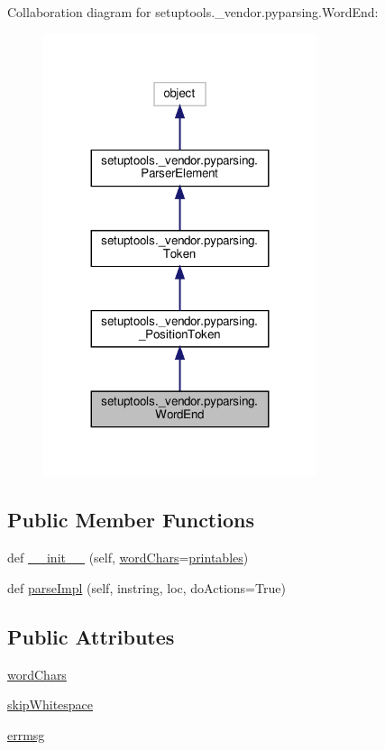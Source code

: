 Collaboration diagram for setuptools.\+\_\+vendor.\+pyparsing.\+Word\+End\+:
\nopagebreak
\begin{figure}[H]
\begin{center}
\leavevmode
\includegraphics[width=227pt]{classsetuptools_1_1__vendor_1_1pyparsing_1_1WordEnd__coll__graph}
\end{center}
\end{figure}
\subsection*{Public Member Functions}
\begin{DoxyCompactItemize}
\item 
def \hyperlink{classsetuptools_1_1__vendor_1_1pyparsing_1_1WordEnd_a16cf414fea8691c74fd805e487967613}{\+\_\+\+\_\+init\+\_\+\+\_\+} (self, \hyperlink{classsetuptools_1_1__vendor_1_1pyparsing_1_1WordEnd_a9a7a435976cb1e5ebc244c13680a1683}{word\+Chars}=\hyperlink{namespacesetuptools_1_1__vendor_1_1pyparsing_a0a5e033cd7141a5a856b879c7b6e730f}{printables})
\item 
def \hyperlink{classsetuptools_1_1__vendor_1_1pyparsing_1_1WordEnd_ae7b93cbcaa7bdb0ec270bc9763a82d25}{parse\+Impl} (self, instring, loc, do\+Actions=True)
\end{DoxyCompactItemize}
\subsection*{Public Attributes}
\begin{DoxyCompactItemize}
\item 
\hyperlink{classsetuptools_1_1__vendor_1_1pyparsing_1_1WordEnd_a9a7a435976cb1e5ebc244c13680a1683}{word\+Chars}
\item 
\hyperlink{classsetuptools_1_1__vendor_1_1pyparsing_1_1WordEnd_aa9367120e34c7fe6f9583c30cb22d695}{skip\+Whitespace}
\item 
\hyperlink{classsetuptools_1_1__vendor_1_1pyparsing_1_1WordEnd_a755a7e6b8a3dc65b67a58c867fa77d4e}{errmsg}
\end{DoxyCompactItemize}
